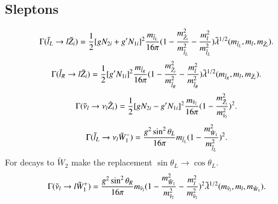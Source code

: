 \documentclass[final,3p,times,pdflatex]{elsarticle}
\begin{document}
\subsection{Sleptons} \label{Sleptons}
\begin{equation}\label{lLlneut}
\begin{aligned}
\Gamma (\tilde{l}_L \rightarrow l \tilde{Z}_i) = \frac{1}{2}[g N_{2i} + g' N_{1i}]^2 {m_{\tilde{l}_L} \over 16\pi} (1 - {m_{\tilde{Z}_i}^2 \over m_{\tilde{l}_L}^2} - {m_{l}^2 \over m_{\tilde{l}_L}^2}) \tilde{\lambda}^{1/2}(m_{\tilde{l}_L}, m_l, m_{\tilde{Z}_i}).
\end{aligned} 
\end{equation} 
\begin{equation}\label{lRlneut}
\begin{aligned}
\Gamma (\tilde{l}_R \rightarrow l \tilde{Z}_i) = \frac{1}{2}[g' N_{1i}]^2 {m_{\tilde{l}_R} \over 16\pi} (1 - {m_{\tilde{Z}_i}^2 \over m_{\tilde{l}_R}^2} - {m_{l}^2 \over m_{\tilde{l}_R}^2}) \tilde{\lambda}^{1/2}(m_{\tilde{l}_R}, m_l, m_{\tilde{Z}_i}).
\end{aligned}
\end{equation} 
\begin{equation}\label{snulnulneut}
\begin{aligned}
\Gamma (\tilde{\nu}_l \rightarrow \nu_l \tilde{Z}_i) = \frac{1}{2}[g N_{2i} - g' N_{1i}]^2 {m_{\tilde{\nu}_l} \over 16\pi} (1 - {m_{\tilde{Z}_i}^2 \over m_{\tilde{\nu}_l}^2} )^2.
\end{aligned}
\end{equation} 
\begin{equation}\label{lLnulch1}
\begin{aligned}
\Gamma (\tilde{l}_L \rightarrow \nu_l \tilde{W}_{1}^{-}) = {g^2 \sin^2 \theta_L \over 16\pi} m_{\tilde{l}_L} (1 - {m_{\tilde{W}_1}^2 \over m_{\tilde{l}_L}^2} )^2.
\end{aligned}
\end{equation} 
For decays to $\tilde{W}_2$ make the replacement $\sin\theta_L \rightarrow \cos\theta_L$.
\begin{equation}\label{nullch1}
\begin{aligned}
\Gamma (\tilde{\nu}_l \rightarrow l \tilde{W}_{1}^{+}) = {g^2 \sin^2 \theta_R \over 16\pi} m_{\tilde{\nu}_l} (1 - {m_{\tilde{W}_1}^2 \over m_{\tilde{\nu}_l}^2} - {m_{l}^2 \over m_{\tilde{\nu}_l}^2} )^2 \tilde{\lambda}^{1/2} (m_{\tilde{\nu}_l}, m_l, m_{\tilde{W}_1}).
\end{aligned}
\end{equation} 
\end{document}
